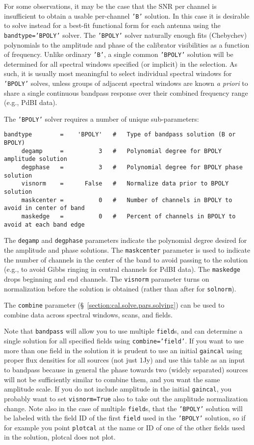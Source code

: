 {For some observations, it may be the case that the SNR per channel is
insufficient to obtain a usable per-channel {\tt 'B'} solution.  In this
case it is desirable to solve instead for a best-fit functional form
for each antenna using the {\tt bandtype='BPOLY'} solver. 
The {\tt 'BPOLY'} solver naturally enough fits (Chebychev) polynomials to the
amplitude and phase of the calibrator 
visibilities as a function of frequency.  Unlike ordinary {\tt 'B'}, a
single common {\tt 'BPOLY'} solution will be determined for all spectral
windows specified (or implicit) in the selection.  As
such, it is usually most meaningful to select individual spectral
windows for {\tt 'BPOLY'} solves, unless groups of adjacent spectral windows
are known {\it a priori} to share a single continuous bandpass
response over their combined frequency range (e.g., PdBI data).

The {\tt 'BPOLY'} solver requires a number of unique sub-parameters:
\small
\begin{verbatim}
bandtype        =    'BPOLY'   #   Type of bandpass solution (B or BPOLY)
     degamp     =          3   #   Polynomial degree for BPOLY amplitude solution
     degphase   =          3   #   Polynomial degree for BPOLY phase solution
     visnorm    =      False   #   Normalize data prior to BPOLY solution
     maskcenter =          0   #   Number of channels in BPOLY to avoid in center of band
     maskedge   =          0   #   Percent of channels in BPOLY to avoid at each band edge
\end{verbatim}
\normalsize
The {\tt degamp} and {\tt degphase} parameters indicate the polynomial degree
desired for the amplitude and phase solutions.  The {\tt maskcenter}
parameter is used to indicate the number of channels in the center
of the band to avoid passing to the solution (e.g., to avoid Gibbs
ringing in central channels for PdBI data).  The {\tt maskedge} drops
beginning and end channels.  The {\tt visnorm} parameter turns on
normalization before the solution is obtained (rather than after for
{\tt solnorm}).

The {\tt combine} parameter (\S~\ref{section:cal.solve.pars.solving}) 
can be used to combine data across spectral windows, scans, and
fields.

Note that {\tt bandpass} will allow you to use multiple {\tt field}s,
and can determine a single solution for all specified fields using
{\tt combine='field'}.   If you want to use more than one
field in the solution it is prudent to use an initial {\tt gaincal}
using proper flux densities for all sources (not just 1Jy)
and use this table as an input to bandpass
because in general the phase towards two (widely separated) sources
will not be sufficiently similar to combine them, and you want the
same amplitude scale.  If you do not
include amplitude in the initial {\tt gaincal}, you probably want
to set {\tt visnorm=True} also to take out the amplitude normalization
change.  Note also in 
the case of multiple {\tt field}s, that the {\tt 'BPOLY'} solution 
will be labeled with the field ID of the first {\tt field} used in
the {\tt 'BPOLY'} solution, so if for example you point {\tt plotcal} at the
name or ID of one of the other fields used in the solution, 
plotcal does not plot.

}

